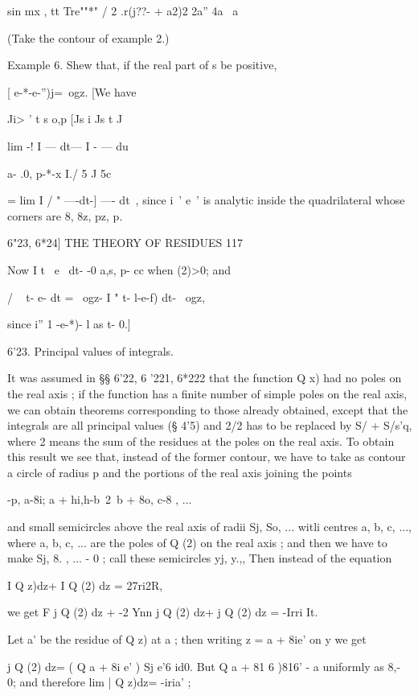{sin mx , tt Tre""*" / 2 .r(j??- + a2)2 2a'' 4a \ a



(Take the contour of example 2.)

Example 6. Shew that, if the real part of s be positive,

[ e-*-e-'')j=\ ogz. [We have

Ji> ' t s o,p [Js i Js t J

lim -! I — dt— I - — du



a- .0, p-*-x I./ 5 J 5c

= lim I / " —-dt-] —- dt\ , since i~' e~' is analytic inside the
quadrilateral whose corners are 8, 8z, pz, p.



6"23, 6*24] THE THEORY OF RESIDUES 117

Now I t~ e~ dt- -0 a,s, p- cc when (2)>0; and

/ ~ t- e- dt = \ ogz- I " t- l-e-f) dt- \ ogz,

since i'' 1 -e-*)- l as t- 0.]

6'23. Principal values of integrals.

It was assumed in §§ 6'22, 6 '221, 6*222 that the function Q x) had no
poles on the real axis ; if the function has a finite number of simple
poles on the real axis, we can obtain theorems corresponding to those
already obtained, except that the integrals are all principal values
(§ 4'5) and 2/2 has to be replaced by S/ + S/s'q, where 2 means the
sum of the residues at the poles on the real axis. To obtain this
result we see that, instead of the former contour, we have to take as
contour a circle of radius p and the portions of the real axis joining
the points

-p, a-8i; a + hi,h-b~2\ b + 8o, c-8 , ...

and small semicircles above the real axis of radii Sj, So, ... witli
centres a, b, c, ..., where a, b, c, ... are the poles of Q (2) on the
real axis ; and then we have to make Sj, 8. , ... - 0 ; call these
semicircles yj, y.,, Then instead of the equation

I Q z)dz+ I Q (2) dz = 27ri2R,

we get F j Q (2) dz + -2 Ynn j Q (2) dz+ j Q (2) dz = -Irri It.

Let a' be the residue of Q z) at a ; then writing z = a + 8ie' on y we
get

j Q (2) dz= ( Q a + 8i e' ) Sj e'6 id0. But Q a + 81 6 )816' - a
uniformly as 8,- 0; and therefore lim | Q z)dz= -iria' ;

}
